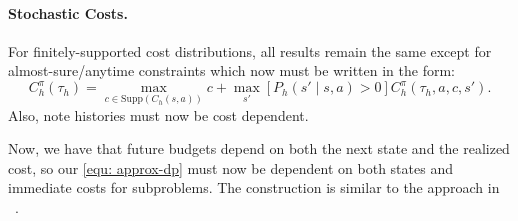 \documentclass[pdftex, a4paper, 12pt]{article}
\newcommand{\supp}{\text{Supp}}
\begin{document}
\paragraph{Stochastic Costs.} For finitely-supported cost distributions, all results remain the same except for almost-sure/anytime constraints which now must be written in the form:
\begin{equation}
    C_h^{\pi}(\tau_h) = \max_{c \in \supp(C_h(s,a))} c + \max_{s'} [P_h(s' \mid s,a) > 0]C_h^{\pi}(\tau_h, a, c, s').
\end{equation}
Also, note histories must now be cost dependent. 

Now, we have that future budgets depend on both the next state and the realized cost, so our \eqref{equ: approx-dp} must now be dependent on both states and immediate costs for subproblems. The construction is similar to the approach in ~\cite{dcRL}.
\end{document}
